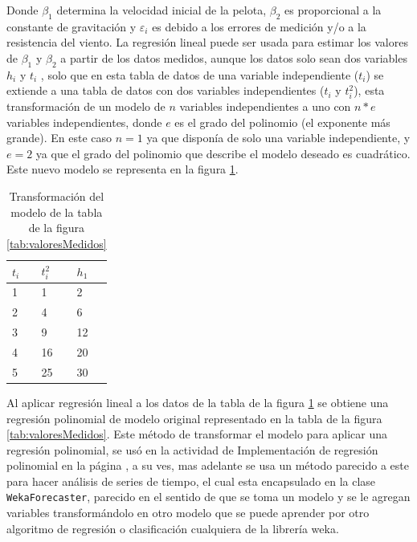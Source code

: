 Donde $\beta_1$ determina la velocidad inicial de la pelota, $\beta_2$ es proporcional a la constante de gravitación y $\varepsilon_i$ es debido a los errores de medición y/o a la resistencia del viento.
La regresión lineal puede ser usada para estimar los valores de $\beta_1$ y $\beta_2$  a partir de los datos medidos, aunque los datos solo sean dos variables $h_i$ y $t_i$ , solo que en esta tabla de datos de una variable independiente ($t_i$) se extiende a una tabla de datos con dos variables independientes ($t_i$ y $t_i^{2}$), esta transformación de un modelo de $n$ variables independientes a uno con $n*e$ variables independientes, donde $e$ es el grado del polinomio (el exponente más grande). En este caso $n=1$ ya que disponía de solo una variable independiente, y $e=2$ ya que el grado del polinomio que describe el modelo deseado es cuadrático. Este nuevo modelo se representa en la figura \ref{tab:transformacionModelo}.
\begin{table}[!h]  
	\begin{center}
		\begin{tabular}{|p{2.5cm}|p{2.5cm}|p{2.5cm}|}\hline
				$t_i$ & $t_i^{2}$ & $h_1$  \\ \hline
				1 & 1 & 2 	\\ \hline
				2 & 4 & 6	\\\hline
				3 & 9 & 12  \\\hline
				4 & 16& 20  \\\hline
				5 & 25& 30   \\\hline
		\end{tabular}			
	\end{center}
	\caption{ Transformación del modelo de la tabla de la figura \ref{tab:valoresMedidos}}
	\label{tab:transformacionModelo}
\end{table}

Al aplicar regresión lineal a los datos de la tabla de la figura \ref{tab:transformacionModelo} se obtiene una regresión
polinomial de modelo original representado en la tabla de la figura \ref{tab:valoresMedidos}. 
Este método de transformar el modelo para aplicar una regresión polinomial, se usó en la actividad de Implementación de regresión polinomial en la página \pageref{subsec:implementacionRegresionPolinomial}, a su ves, mas adelante se usa un método parecido a este para hacer análisis de series de tiempo, el cual esta encapsulado en la clase \texttt{WekaForecaster}, parecido en el sentido de que se toma un modelo y se le agregan variables transformándolo en otro modelo que se puede aprender por otro algoritmo de regresión o clasificación cualquiera de la librería weka.

